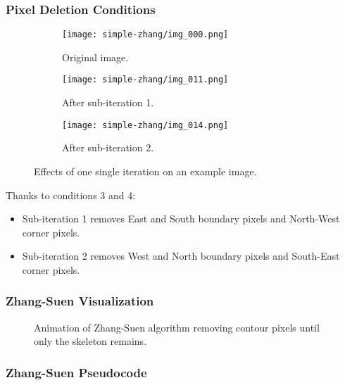 \begin{frame}
  \frametitle{Pixel Deletion Conditions}
  \begin{figure}
    \centering
    \begin{subfigure}[b]{0.3\textwidth}
      \centering
      \texttt{[image: simple-zhang/img\_000.png]}
      \caption{Original image.}
    \end{subfigure}
    \hfill
    \begin{subfigure}[b]{0.3\textwidth}
      \centering
      \texttt{[image: simple-zhang/img\_011.png]}
      \caption{After sub-iteration 1.}
    \end{subfigure}
    \hfill
    \begin{subfigure}[b]{0.3\textwidth}
      \centering
      \texttt{[image: simple-zhang/img\_014.png]}
      \caption{After sub-iteration 2.}
    \end{subfigure}
    \caption{Effects of one single iteration on an example image.}
  \end{figure}
  Thanks to conditions 3 and 4:
  \begin{itemize}
    \item Sub-iteration 1 removes East and South boundary pixels and North-West corner pixels.
    \item Sub-iteration 2 removes West and North boundary pixels and South-East corner pixels.
  \end{itemize}
\end{frame}

\begin{frame}[c]
  \frametitle{Zhang-Suen Visualization}
  \centering
  \begin{figure}
  \caption{Animation of Zhang-Suen algorithm removing contour pixels until only the skeleton remains.}
  \end{figure}
\end{frame}

\begin{frame}
  \frametitle{Zhang-Suen Pseudocode}
  
\end{frame}
